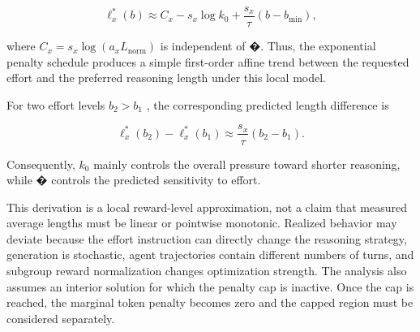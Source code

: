 \documentclass[
  10
]{article}
\begin{document}
\[
\ell_ {x} ^ {*} (b) \approx C _ {x} - s _ {x} \log k _ {0} + \frac {s _ {x}}{\tau} (b - b _ {\mathrm{min}}),\tag{16}
\]

where
\(C _ { x } = s _ { x } \log ( a _ { x } L _ { \mathrm { n o r m } } )\)
is independent of �. Thus, the exponential penalty schedule produces a
simple first-order affine trend between the requested effort and the
preferred reasoning length under this local model.

For two effort levels \(b _ { 2 } > b _ { 1 }\) , the corresponding
predicted length difference is

\[
\ell_ {x} ^ {*} (b _ {2}) - \ell_ {x} ^ {*} (b _ {1}) \approx \frac {s _ {x}}{\tau} (b _ {2} - b _ {1}).\tag{17}
\]

Consequently, \(k _ { 0 }\) mainly controls the overall pressure toward
shorter reasoning, while � controls the predicted sensitivity to effort.

This derivation is a local reward-level approximation, not a claim that
measured average lengths must be linear or pointwise monotonic. Realized
behavior may deviate because the effort instruction can directly change
the reasoning strategy, generation is stochastic, agent trajectories
contain different numbers of turns, and subgroup reward normalization
changes optimization strength. The analysis also assumes an interior
solution for which the penalty cap is inactive. Once the cap is reached,
the marginal token penalty becomes zero and the capped region must be
considered separately.
\end{document}
